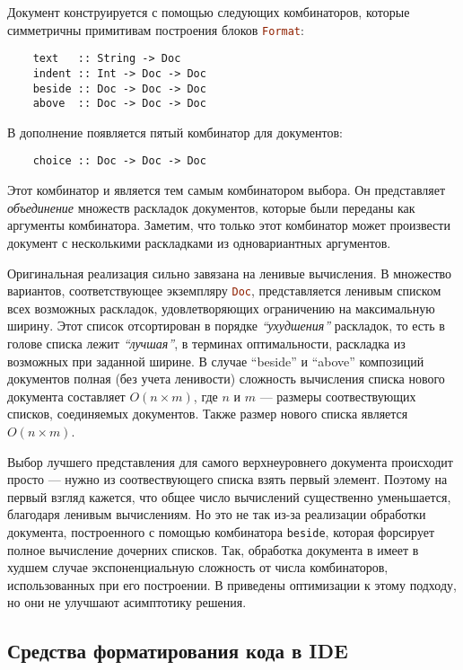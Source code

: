 Документ конструируется с помощью следующих комбинаторов, которые симметричны
примитивам построения блоков \lstinline[language = Haskell]{Format}:
\begin{lstlisting}
    text   :: String -> Doc
    indent :: Int -> Doc -> Doc
    beside :: Doc -> Doc -> Doc
    above  :: Doc -> Doc -> Doc
\end{lstlisting}

В дополнение появляется пятый комбинатор для документов:
\begin{lstlisting}
    choice :: Doc -> Doc -> Doc
\end{lstlisting}

Этот комбинатор и является тем самым комбинатором выбора. Он представляет
\emph{объединение} множеств раскладок документов, которые были переданы как
аргументы комбинатора. Заметим, что только этот комбинатор может произвести
документ с несколькими раскладками из одновариантных аргументов.

Оригинальная реализация сильно завязана на ленивые вычисления. В \cite{swierstra}
множество вариантов, соответствующее экземпляру \lstinline[language = Haskell]{Doc},
представляется ленивым списком всех возможных раскладок, удовлетворяющих ограничению
на максимальную ширину. Этот список отсортирован в порядке \emph{``ухудшения''}
раскладок, то есть в голове списка лежит \emph{``лучшая''}, в терминах оптимальности,
раскладка из возможных при заданной ширине. В случае ``beside'' и ``above'' композиций
документов полная (без учета ленивости) сложность вычисления списка нового документа
составляет $O(n \times m)$, где $n$ и $m$ --- размеры соотвествующих списков,
соединяемых документов. Также размер нового списка является $O(n \times m)$.

Выбор лучшего представления для самого верхнеуровнего документа происходит
просто --- нужно из соотвествующего списка взять первый элемент. Поэтому
на первый взгляд кажется, что общее число вычислений существенно уменьшается,
благодаря ленивым вычислениям. Но это не так из-за реализации обработки документа,
построенного с помощью комбинатора \lstinline[language = Haskell]{beside}, которая
форсирует полное вычисление дочерних списков. Так, обработка документа в
\cite{swierstra} имеет в худшем случае экспоненциальную сложность от числа
комбинаторов, использованных при его построении.
В \cite{swiComb} приведены оптимизации к этому подходу, но они
не улучшают асимптотику решения.

\newpage
\subsection{Средства форматирования кода в IDE}


